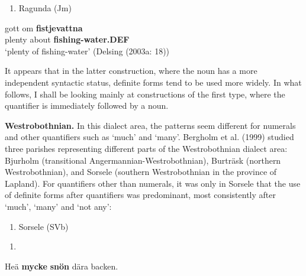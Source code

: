 \begin{enumerate} %
\item 
Ragunda (Jm)

\end{enumerate} %
\ea\label{}
\gll gott  om  \textbf{fistjevattna} \\


plenty  about  \textbf{fishing-water.DEF} \\ %


‘plenty of fishing-water’ (Delsing (2003a: 18))
\z

It appears that in the latter construction, where the noun has a more independent syntactic status, definite forms tend to be used more widely. In what follows, I shall be looking mainly at constructions of the first type, where the quantifier is immediately followed by a noun. 

\textbf{Westrobothnian.} In this dialect area, the patterns seem different for numerals and other quantifiers such as ‘much’ and ‘many’. Bergholm et al. (1999) studied three parishes representing different parts of the Westrobothnian dialect area: Bjurholm (transitional Angermannian-Westrobothnian), Burträsk (northern Westrobothnian), and Sorsele (southern Westrobothnian in the province of Lapland). For quantifiers other than numerals, it was only in Sorsele that the use of definite forms after quantifiers was predominant, most consistently after ‘much’, ‘many’ and ‘not any’:

\begin{enumerate} %
\item 
Sorsele (SVb)

\end{enumerate} %
\setcounter{listLFOxcviiileveli}{0}
\begin{enumerate} %
\item 
\end{enumerate} %
\ea\label{}
\gll Heä  \textbf{mycke} \textbf{snön} dära  backen.\\


